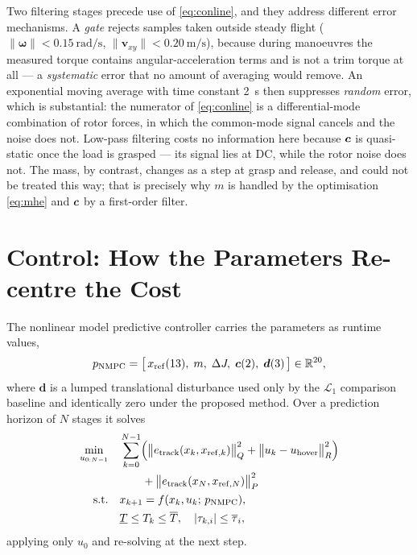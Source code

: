 Two filtering stages precede use of \eqref{eq:conline}, and they address
different error mechanisms. A \emph{gate} rejects samples taken outside
steady flight ($\|\bm{\omega}\| < \SI{0.15}{\radian\per\second}$,
$\|\bm{v}_{xy}\| < \SI{0.20}{\meter\per\second}$), because during
manoeuvres the measured torque contains angular-acceleration terms and is
not a trim torque at all --- a \emph{systematic} error that no amount of
averaging would remove. An exponential moving average with time constant
\SI{2}{\second} then suppresses \emph{random} error, which is
substantial: the numerator of \eqref{eq:conline} is a differential-mode
combination of rotor forces, in which the common-mode signal cancels and
the noise does not. Low-pass filtering costs no information here because
$\bm{c}$ is quasi-static once the load is grasped --- its signal lies at
DC, while the rotor noise does not. The mass, by contrast, changes as a
step at grasp and release, and could not be treated this way; that is
precisely why $m$ is handled by the optimisation \eqref{eq:mhe} and
$\bm{c}$ by a first-order filter.

\section{Control: How the Parameters Re-centre the Cost}\label{sec:model:ctrl}

The nonlinear model predictive controller carries the parameters as
runtime values,
\begin{equation}
p_{\mathrm{NMPC}} = \bigl[\, x_{\mathrm{ref}}(13),\; m,\; \Delta J,\; \bm{c}(2),\; \bm{d}(3) \,\bigr] \in \mathbb{R}^{20},
\label{eq:pnmpc}
\end{equation}
where $\bm{d}$ is a lumped translational disturbance used only by the
$\mathcal{L}_1$ comparison baseline and identically zero under the
proposed method. Over a prediction horizon of $N$ stages it solves
\begin{align}
\min_{u_{0:N-1}} \quad
& \sum_{k=0}^{N-1} \Bigl( \bigl\| e_{\mathrm{track}}(x_k, x_{\mathrm{ref},k}) \bigr\|^2_{Q}
+ \bigl\| u_k - u_{\mathrm{hover}} \bigr\|^2_{R} \Bigr) \nonumber \\
& \qquad + \bigl\| e_{\mathrm{track}}(x_N, x_{\mathrm{ref},N}) \bigr\|^2_{P} \nonumber \\
\mathrm{s.t.} \quad
& x_{k+1} = f(x_k, u_k;\, p_{\mathrm{NMPC}}), \nonumber \\
& \underline{T} \le T_k \le \overline{T}, \quad
  |\tau_{k,i}| \le \overline{\tau}_i ,
\label{eq:nmpc}
\end{align}
applying only $u_0$ and re-solving at the next step.

